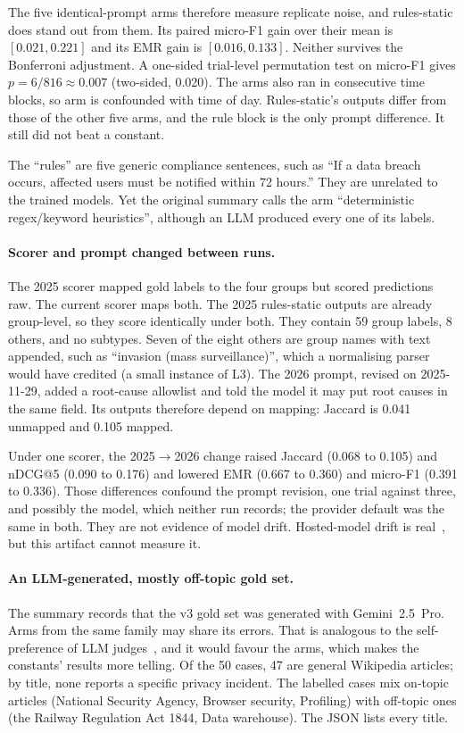 \documentclass[10pt,twocolumn]{article}
\begin{document}
The five identical-prompt arms therefore measure replicate noise, and
rules-static does stand out from them. Its paired micro-F1 gain over their mean
is $[0.021, 0.221]$ and its EMR gain is $[0.016, 0.133]$. Neither survives the
Bonferroni adjustment. A one-sided trial-level permutation test on micro-F1
gives $p = 6/816 \approx 0.007$ (two-sided, 0.020). The arms also ran in
consecutive time blocks, so arm is confounded with time of day. Rules-static's
outputs differ from those of the other five arms, and the rule block is the
only prompt difference. It still did not beat a constant.

The ``rules'' are five generic compliance sentences, such as ``If a data breach
occurs, affected users must be notified within 72 hours.'' They are unrelated
to the trained models. Yet the original summary calls the arm
``deterministic regex/keyword heuristics'', although an LLM produced every one
of its labels.

\paragraph{Scorer and prompt changed between runs.} The 2025 scorer mapped gold
labels to the four groups but scored predictions raw. The current scorer maps
both. The 2025 rules-static outputs are already group-level, so they score
identically under both. They contain 59 group labels, 8 others, and no
subtypes. Seven of the eight others are group names with text appended, such
as ``invasion (mass surveillance)'', which a normalising parser would have
credited (a small instance of L3).
The 2026 prompt, revised on 2025-11-29, added a root-cause allowlist and told
the model it may put root causes in the same field. Its outputs therefore
depend on mapping: Jaccard is 0.041 unmapped and 0.105 mapped.

Under one scorer, the 2025$\to$2026 change raised Jaccard (0.068 to 0.105) and
nDCG@5 (0.090 to 0.176) and lowered EMR (0.667 to 0.360) and micro-F1 (0.391
to 0.336). Those differences confound the prompt revision, one trial against
three, and possibly the model, which neither run records; the provider default
was the same in both. They are not evidence of model drift. Hosted-model drift
is real~\cite{chen2023,pozzobon2023}, but this artifact cannot measure it.

\paragraph{An LLM-generated, mostly off-topic gold set.} The summary records
that the v3 gold set was generated with Gemini~2.5~Pro. Arms from the same
family may share its errors. That is analogous to the self-preference of LLM
judges~\cite{panickssery2024,zheng2023}, and it would favour the arms, which
makes the constants' results more telling. Of the 50 cases, 47 are general
Wikipedia articles; by title, none reports a specific privacy incident. The
labelled cases mix on-topic articles (National Security Agency, Browser
security, Profiling) with off-topic ones (the Railway Regulation Act 1844, Data
warehouse). The JSON lists every title.
\end{document}
